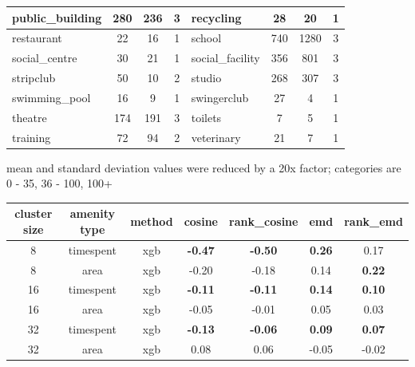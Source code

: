 \begin{table}[!ht]
{\begin{tabular}{ | l | c | c | c || l | c | c | c |}
		public\_building & 280 & 236 & 3 & recycling & 28 & 20 & 1 \\ \hline
		restaurant & 22 & 16 & 1 & school & 740 & 1280 & 3 \\ \hline
		social\_centre & 30 & 21 & 1 & social\_facility & 356 & 801 & 3 \\ \hline
		stripclub & 50 & 10 & 2 & studio & 268 & 307 & 3 \\ \hline
		swimming\_pool & 16 & 9 & 1 & swingerclub & 27 & 4 & 1 \\ \hline
		theatre & 174 & 191 & 3 & toilets & 7 & 5 & 1 \\ \hline
		training & 72 & 94 & 2 & veterinary & 21 & 7 & 1 \\ \hline
	\end{tabular}}
	\label{extensions:amenity_area_values}
	\begin{tabnote}
		mean and standard deviation values were reduced by a 20x factor; categories are 0 - 35, 36 - 100, 100+
	\end{tabnote}
\end{table}

\begin{table}[!ht]
		{\begin{tabular}{ | c | c | c | c | c | c | c | }
			\hline
			{cluster size} & {amenity type} & method & cosine & rank\_cosine & emd & rank\_emd \\ \hline
			8 & timespent & xgb & \textbf{-0.47} & \textbf{-0.50} & \textbf{0.26} & 0.17 \\ \hline
			8 & area & xgb & -0.20 & -0.18 & 0.14 & \textbf{0.22} \\ \hline \hline
			16 & timespent & xgb & \textbf{-0.11} & \textbf{-0.11} & \textbf{0.14} & \textbf{0.10} \\ \hline
			16 & area & xgb & -0.05 & -0.01 & 0.05 & 0.03 \\ \hline \hline
			32 & timespent & xgb & \textbf{-0.13} & \textbf{-0.06} & \textbf{0.09} & \textbf{0.07} \\ \hline
			32 & area & xgb & 0.08 & 0.06 & -0.05 & -0.02 \\ \hline
		\end{tabular}}
		\label{extensions:correlation_amenity_area}
\end{table}

